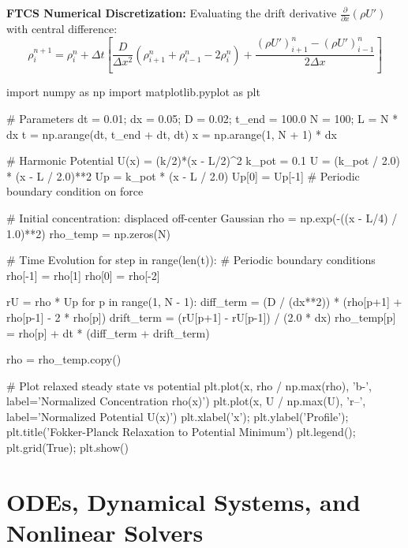 \documentclass{article}
\begin{document}
\textbf{FTCS Numerical Discretization:}
Evaluating the drift derivative $\frac{\partial}{\partial x}(\rho U')$ with central difference:
$$\rho_i^{n+1} = \rho_i^n + \Delta t \left[ \frac{D}{\Delta x^2}(\rho_{i+1}^n + \rho_{i-1}^n - 2\rho_i^n) + \frac{(\rho U')_{i+1}^n - (\rho U')_{i-1}^n}{2 \Delta x} \right]$$

\begin{jupytercode}
import numpy as np
import matplotlib.pyplot as plt

# Parameters
dt = 0.01; dx = 0.05; D = 0.02; t_end = 100.0
N = 100; L = N * dx
t = np.arange(dt, t_end + dt, dt)
x = np.arange(1, N + 1) * dx

# Harmonic Potential U(x) = (k/2)*(x - L/2)^2
k_pot = 0.1
U = (k_pot / 2.0) * (x - L / 2.0)**2
Up = k_pot * (x - L / 2.0)
Up[0] = Up[-1] # Periodic boundary condition on force

# Initial concentration: displaced off-center Gaussian
rho = np.exp(-((x - L/4) / 1.0)**2)
rho_temp = np.zeros(N)

# Time Evolution
for step in range(len(t)):
    # Periodic boundary conditions
    rho[-1] = rho[1]
    rho[0] = rho[-2]
    
    rU = rho * Up
    for p in range(1, N - 1):
        diff_term = (D / (dx**2)) * (rho[p+1] + rho[p-1] - 2 * rho[p])
        drift_term = (rU[p+1] - rU[p-1]) / (2.0 * dx)
        rho_temp[p] = rho[p] + dt * (diff_term + drift_term)
        
    rho = rho_temp.copy()

# Plot relaxed steady state vs potential
plt.plot(x, rho / np.max(rho), 'b-', label='Normalized Concentration rho(x)')
plt.plot(x, U / np.max(U), 'r--', label='Normalized Potential U(x)')
plt.xlabel('x'); plt.ylabel('Profile'); plt.title('Fokker-Planck Relaxation to Potential Minimum')
plt.legend(); plt.grid(True); plt.show()
\end{jupytercode}
\newpage

\section{ODEs, Dynamical Systems, and Nonlinear Solvers}
\end{document}
